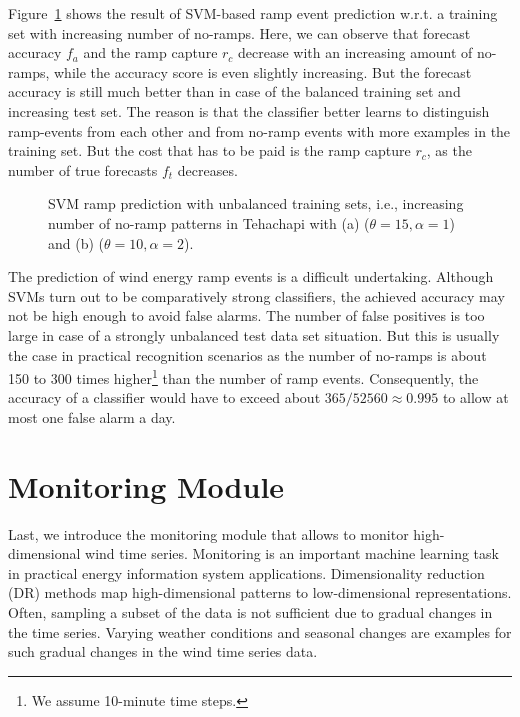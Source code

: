 \documentclass[10pt, conference, compsocconf]{IEEEtran}
\begin{document}
Figure~\ref{fig:unbalanced2} shows the result of SVM-based ramp event prediction w.r.t. a training set with increasing number of no-ramps. Here, we can observe that forecast accuracy $f_a$ and the ramp capture $r_c$ decrease with an increasing amount of no-ramps, while the accuracy score is even slightly increasing. But the forecast accuracy is still much better than in case of the balanced training set and increasing test set. The reason is that the classifier better learns to distinguish ramp-events from each other and from no-ramp events with more examples in the training set. But the cost that has to be paid is the ramp capture $r_c$, as the number of true forecasts $f_t$ decreases. 


\begin{figure}[thb]
\centering
{}
\caption{SVM ramp prediction with unbalanced training sets, i.e., increasing number of no-ramp patterns in Tehachapi with (a) ($\theta = 15, \alpha = 1$) and (b) ($\theta = 10, \alpha = 2$).}
\label{fig:unbalanced2}
\end{figure}

The prediction of wind energy ramp events is a difficult undertaking. Although SVMs turn out to be comparatively strong classifiers, the achieved accuracy may not be high enough to avoid false alarms. The number of false positives is too large in case of a strongly unbalanced test data set situation. But this is usually the case in practical recognition scenarios as the number of no-ramps is about 150 to 300 times higher\footnote{We assume 10-minute time steps.} than the number of ramp events. Consequently, the accuracy of a classifier would have to exceed about $365/52560 \approx 0.995$ to allow at most one false alarm a day.



\section{Monitoring Module}
\label{sec:dimred}

Last, we introduce the monitoring module that allows to monitor high-dimensional wind time series. Monitoring is an important machine learning task in practical energy information system applications. Dimensionality reduction (DR) methods map high-dimensional patterns to low-dimensional representations. Often, sampling a subset of the data is not sufficient due to gradual changes in the time series. Varying weather conditions and seasonal changes are examples for such gradual changes in the wind time series data. 
\end{document}
